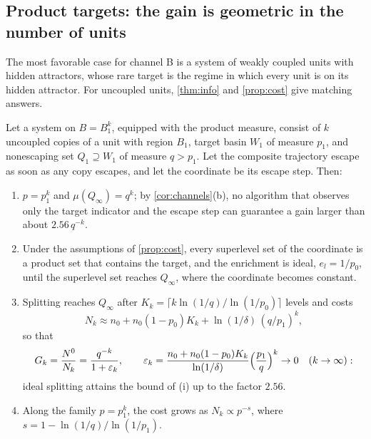 \subsection{Product targets: the gain is geometric in the number of units}\label{sec:product}

The most favorable case for channel B is a system of weakly coupled units with hidden attractors, whose rare target is the regime in which every unit is on its hidden attractor. For uncoupled units, \cref{thm:info} and \cref{prop:cost} give matching answers.

\begin{proposition}\label{prop:product}
Let a system on $B=B_1^k$, equipped with the product measure, consist of $k$ uncoupled copies of a unit with region $B_1$, target basin $W_1$ of measure $p_1$, and nonescaping set $Q_1\supseteq W_1$ of measure $q>p_1$. Let the composite trajectory escape as soon as any copy escapes, and let the coordinate be its escape step. Then:
\begin{enumerate}
\item[\textup{(i)}] $p=p_1^k$ and $\mu(Q_\infty)=q^k$; by \cref{cor:channels}\textup{(b)}, no algorithm that observes only the target indicator and the escape step can guarantee a gain larger than about $2.56\,q^{-k}$.
\item[\textup{(ii)}] Under the assumptions of \cref{prop:cost}, every superlevel set of the coordinate is a product set that contains the target, and the enrichment is ideal, $e_l=1/p_0$, until the superlevel set reaches $Q_\infty$, where the coordinate becomes constant.
\item[\textup{(iii)}] Splitting reaches $Q_\infty$ after $K_k=\lceil k\ln(1/q)/\ln(1/p_0)\rceil$ levels and costs
\begin{equation}
N_k\approx n_0+n_0(1-p_0)K_k+\ln(1/\delta)\,(q/p_1)^k,
\label{eq:Nk}
\end{equation}
so that
\begin{equation*}
G_k=\frac{N^0}{N_k}=\frac{q^{-k}}{1+\varepsilon_k},\qquad \varepsilon_k=\frac{n_0+n_0(1-p_0)K_k}{\ln(1/\delta)}\Bigl(\frac{p_1}{q}\Bigr)^k\to0\quad(k\to\infty):
\end{equation*}
ideal splitting attains the bound of \textup{(i)} up to the factor $2.56$.
\item[\textup{(iv)}] Along the family $p=p_1^k$, the cost grows as $N_k\propto p^{-s}$, where $s=1-\ln(1/q)/\ln(1/p_1)$.
\end{enumerate}
\end{proposition}

